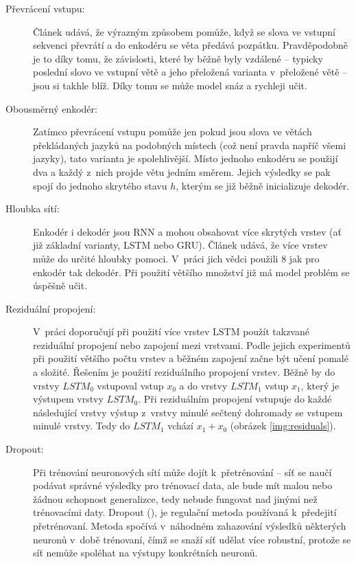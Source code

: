 \begin{description}
  \item[Převrácení vstupu:] \label{desc:revert} Článek \cite{seq2seq} udává, že výrazným způsobem pomůže, když se slova ve vstupní sekvenci převrátí a do enkodéru  se věta předává pozpátku. Pravděpodobně je to díky tomu, že závislosti, které by běžně byly vzdálené -- typicky poslední slovo ve vstupní větě a jeho přeložená varianta v~přeložené větě -- jsou si takhle blíž. Díky tomu se může model snáz a rychleji učit.
  \item[Obousměrný enkodér:] \label{desc:biriectional} Zatímco převrácení vstupu pomůže jen pokud jsou slova ve větách překládaných jazyků na podobných místech (což není pravda napříč všemi jazyky), tato varianta je spolehlivější. Místo jednoho enkodéru se použijí dva a každý z~nich projde větu jedním směrem. Jejich výsledky se pak spojí do jednoho skrytého stavu $h$, kterým se již běžně inicializuje dekodér.
  \item[Hloubka sítí:] Enkodér i dekodér jsou RNN a mohou obsahovat více skrytých vrstev (ať již základní varianty, LSTM nebo GRU). Článek \cite{googleBridgingGap} udává, že více vrstev může do určité hloubky pomoci. V~práci jich vědci použili 8 jak pro enkodér tak dekodér. Při použití většího množství již má model problém se úspěšně učit.
  \item[Reziduální propojení:] \label{residuals} V~práci \cite{googleBridgingGap} doporučují při použití více vrstev LSTM použít takzvané reziduální propojení nebo zapojení mezi vrstvami. Podle jejich experimentů při použití většího počtu vrstev a běžném zapojení začne být učení pomalé a složité. Řešením je použití reziduálního propojení vrstev. Běžně by do vrstvy $LSTM_0$ vstupoval vstup $x_0$ a do vrstvy $LSTM_1$ vstup $x_1$, který je výstupem vrstvy $LSTM_0$. Při reziduálním propojení vstupuje do každé následující vrstvy výstup z~vrstvy minulé sečtený dohromady se vstupem minulé vrstvy. Tedy do $LSTM_1$ vchází $x_1+x_0$ (obrázek \ref{img:residuals}).
  \item[Dropout:] \label{desc:dropout} Při trénování neuronových sítí může dojít k~přetrénování -- síť se naučí podávat správné výsledky pro trénovací data, ale bude mít malou nebo žádnou schopnost generalizce, tedy nebude fungovat nad jinými než trénovacími daty. Dropout (\cite{dropout}), je regulační metoda používaná k~předejití přetrénovaní. Metoda spočívá v~náhodném zahazování výsledků některých neuronů v~době trénovaní, čímž se snaží síť udělat více robustní, protože se síť nemůže spoléhat na výstupy konkrétních neuronů.

\end{description}

